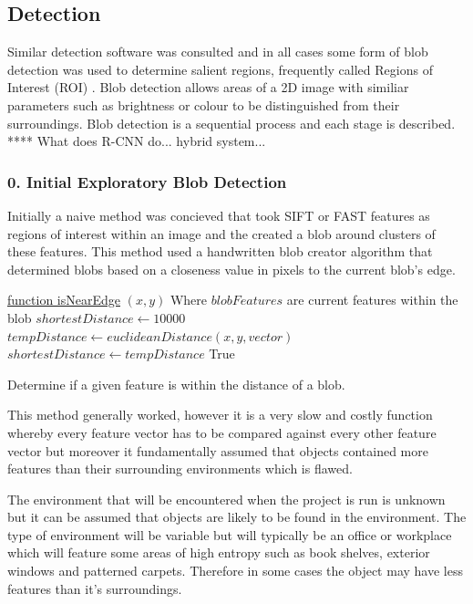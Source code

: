 \documentclass{mproj}
\begin{document}
\subsection{Detection}

Similar detection software was consulted and in all cases some form of blob detection was used to determine salient regions, frequently called Regions of Interest (ROI) \cite{HosangBS14}. Blob detection allows areas of a 2D image with similiar parameters such as brightness or colour to be distinguished from their surroundings. Blob detection is a sequential process and each stage is described.  **** What does R-CNN do... hybrid system...

\subsubsection{0. Initial Exploratory Blob Detection}

Initially a naive method was concieved that took SIFT or FAST features as regions of interest within an image and the created a blob around clusters of these features. This method used a handwritten blob creator algorithm that determined blobs based on a closeness value in pixels to the current blob's edge.

 \begin{algorithm}

    \underline{function isNearEdge} $(x,y)$\;
    Where $blobFeatures$ are current features within the blob\;
    $shortestDistance \leftarrow 10000 $\;
    {
    $tempDistance \leftarrow euclideanDistance( x,y,vector ) $\;
    {
    	$shortestDistance \leftarrow tempDistance$
    }
    }
    { 
    	\Return True
    }

    
    \caption{Determine if a given feature is within the distance of a blob.  }
\end{algorithm}

This method generally worked, however it is a very slow and costly function whereby every feature vector has to be compared against every other feature vector but moreover it fundamentally assumed that objects contained more features than their surrounding environments which is flawed. 

The environment that will be encountered when the project is run is unknown but it can be assumed that objects are likely to be found in the environment. The type of environment will be variable but will typically be an office or workplace which will feature some areas of high entropy such as book shelves, exterior windows and patterned carpets. Therefore in some cases the object may have less features than it's surroundings.
\end{document}
